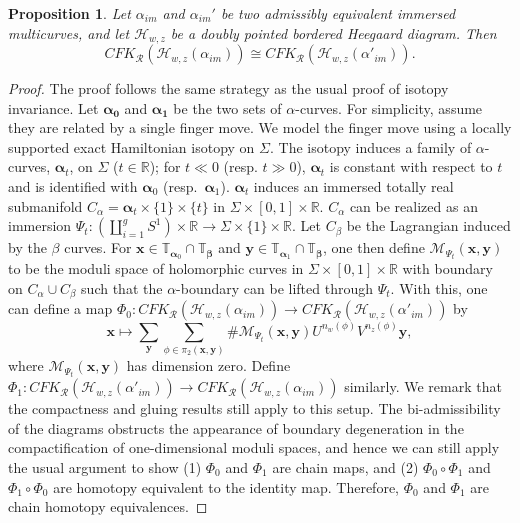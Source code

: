 \documentclass{amsart}
\newtheorem{prop}[thm]{Proposition}
\theoremstyle{definition}
\theoremstyle{remark}
\numberwithin{equation}{section}
\numberwithin{equation}{section} \makeatletter
\begin{document}
\begin{prop}\label{Proposition, finger move independence}
	Let $\alpha_{im}$ and $\alpha_{im}'$ be two admissibly equivalent immersed multicurves, and let $\mathcal{H}_{w,z}$ be a doubly pointed bordered Heegaard diagram. Then $$CFK_{\mathcal{R}}(\mathcal{H}_{w,z}(\alpha_{im}))\cong CFK_{\mathcal{R}}(\mathcal{H}_{w,z}(\alpha'_{im})).$$
\end{prop}

\begin{proof}
	The proof follows the same strategy as the usual proof of isotopy invariance. Let $\bm{\alpha_0}$ and $\bm{\alpha_1}$ be the two sets of $\alpha$-curves. For simplicity, assume they are related by a single finger move. We model the finger move using a locally supported exact Hamiltonian isotopy on $\Sigma$. The isotopy induces a family of $\alpha$-curves, $\bm{\alpha}_t$, on $\Sigma$ ($t\in \mathbb{R}$); for $t\ll 0$ (resp. $t\gg 0$), $\bm{\alpha}_t$ is constant with respect to $t$ and is identified with $\bm{\alpha}_0$ (resp.\ $\bm{\alpha}_1$). $\bm{\alpha}_t$ induces an immersed totally real submanifold $C_{\alpha}=\bm{\alpha}_t\times\{1\}\times\{t\}$ in $\Sigma\times[0,1]\times \mathbb{R}$. $C_{\alpha}$ can be realized as an immersion $\Psi_t: (\amalg_{i=1}^g S^1)\times \mathbb{R}\rightarrow \Sigma\times\{1\}\times \mathbb{R}.$ Let $C_{\beta}$ be the Lagrangian induced by the $\beta$ curves. For $\bm{x}\in \mathbb{T}_{\bm{\alpha}_0}\cap \mathbb{T}_{\bm{\beta}}$ and $\bm{y} \in\mathbb{T}_{\bm{\alpha}_1}\cap \mathbb{T}_{\bm{\beta}}$, one then define $\mathcal{M}_{\Psi_t}(\bm{x},\bm{y})$ to be the moduli space of holomorphic curves in $\Sigma\times[0,1]\times \mathbb{R}$ with boundary on $C_{\alpha}\cup C_{\beta}$ such that the $\alpha$-boundary can be lifted through $\Psi_{t}$. With this, one can define a map $\Phi_0: CFK_{\mathcal{R}}(\mathcal{H}_{w,z}(\alpha_{im}))\rightarrow CFK_{\mathcal{R}}(\mathcal{H}_{w,z}(\alpha'_{im}))$ by $$\bm{x}\mapsto \sum_{\bm{y}}\sum_{\phi \in \pi_2(\bm{x},\bm{y})}\#\mathcal{M}_{\Psi_t}(\bm{x},\bm{y})U^{n_w(\phi)}V^{n_z(\phi)}\bm{y},$$
	where $\mathcal{M}_{\Psi_t}(\bm{x},\bm{y})$ has dimension zero. Define $\Phi_1:CFK_{\mathcal{R}}(\mathcal{H}_{w,z}(\alpha'_{im})) \rightarrow CFK_{\mathcal{R}}(\mathcal{H}_{w,z}(\alpha_{im}))$ similarly. We remark that the compactness and gluing results still apply to this setup. The bi-admissibility of the diagrams obstructs the appearance of boundary degeneration in the compactification of one-dimensional moduli spaces, and hence we can still apply the usual argument to show (1) $\Phi_0$ and $\Phi_1$ are chain maps, and (2) $\Phi_0\circ \Phi_1$ and $\Phi_1\circ \Phi_0$ are homotopy equivalent to the identity map. Therefore, $\Phi_0$ and $\Phi_1$ are chain homotopy equivalences. 
\end{proof}
\end{document}
